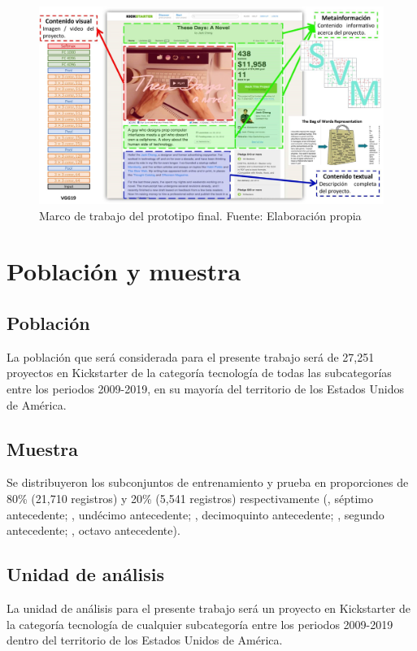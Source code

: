 \begin{figure}[htbp]
	\begin{center}
		\includegraphics[width=1\textwidth]{3/figures/prototipo.jpg}
		\caption{Marco de trabajo del prototipo final. Fuente: Elaboración propia}
		\label{3:fig1}
	\end{center}
\end{figure}

\section{Población y muestra}

\subsection{Población}
La población que será considerada para el presente trabajo será de 27,251 proyectos en Kickstarter de la categoría tecnología de todas las subcategorías entre los periodos 2009-2019, en su mayoría del territorio de los Estados Unidos de América.

\subsection{Muestra}
Se distribuyeron los subconjuntos de entrenamiento y prueba en proporciones de 80\% (21,710 registros) y 20\% (5,541 registros) respectivamente (\citeauthor{pr_yuan2016textanalytics}, séptimo antecedente; \citeauthor{pr_yu2018deeplearning}, undécimo antecedente; \citeauthor{pr_chen2019keywords_crowdfunding}, decimoquinto antecedente; \citeauthor{pr_mitra2014phrases}, segundo antecedente; \citeauthor{pr_sawhney2016usingLT}, octavo antecedente).

\subsection{Unidad de análisis}
La unidad de análisis para el presente trabajo será un proyecto en Kickstarter de la categoría tecnología de cualquier subcategoría entre los periodos 2009-2019 dentro del territorio de los Estados Unidos de América.

